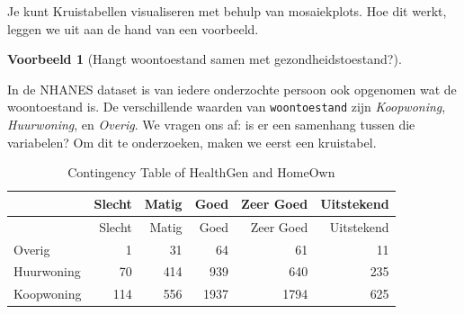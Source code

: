 \documentclass[
  a4paper,
]{scrbook}
\newenvironment{Shaded}{\begin{snugshade}}{\end{snugshade}}
\newcommand{\AttributeTok}[1]{\textcolor[rgb]{0.40,0.45,0.13}{#1}}
\newcommand{\CommentTok}[1]{\textcolor[rgb]{0.37,0.37,0.37}{#1}}
\newcommand{\ConstantTok}[1]{\textcolor[rgb]{0.56,0.35,0.01}{#1}}
\newcommand{\FunctionTok}[1]{\textcolor[rgb]{0.28,0.35,0.67}{#1}}
\newcommand{\NormalTok}[1]{\textcolor[rgb]{0.00,0.23,0.31}{#1}}
\newcommand{\OtherTok}[1]{\textcolor[rgb]{0.00,0.23,0.31}{#1}}
\newcommand{\SpecialCharTok}[1]{\textcolor[rgb]{0.37,0.37,0.37}{#1}}
\newcommand{\StringTok}[1]{\textcolor[rgb]{0.13,0.47,0.30}{#1}}
\theoremstyle{definition}
\theoremstyle{definition}
\newtheorem{example}{Voorbeeld}[chapter]
\theoremstyle{remark}
\begin{document}
Je kunt Kruistabellen visualiseren met behulp van mosaiekplots. Hoe dit
werkt, leggen we uit aan de hand van een voorbeeld.

\begin{example}[Hangt woontoestand samen met
gezondheidstoestand?]\protect\hypertarget{exm-mosaic}{}\label{exm-mosaic}

In de NHANES dataset is van iedere onderzochte persoon ook opgenomen wat
de woontoestand is. De verschillende waarden van \texttt{woontoestand}
zijn \emph{Koopwoning}, \emph{Huurwoning}, en \emph{Overig}. We vragen
ons af: is er een samenhang tussen die variabelen? Om dit te
onderzoeken, maken we eerst een kruistabel.

\begin{Shaded}
\end{Shaded}

\begin{longtable}[]{@{}lrrrrr@{}}
\caption{Contingency Table of HealthGen and HomeOwn}\tabularnewline
\toprule\noalign{}
& Slecht & Matig & Goed & Zeer Goed & Uitstekend \\
\midrule\noalign{}
\endfirsthead
\toprule\noalign{}
& Slecht & Matig & Goed & Zeer Goed & Uitstekend \\
\midrule\noalign{}
\endhead
\bottomrule\noalign{}
\endlastfoot
Overig & 1 & 31 & 64 & 61 & 11 \\
Huurwoning & 70 & 414 & 939 & 640 & 235 \\
Koopwoning & 114 & 556 & 1937 & 1794 & 625 \\
\end{longtable}


\end{example}
\end{document}
